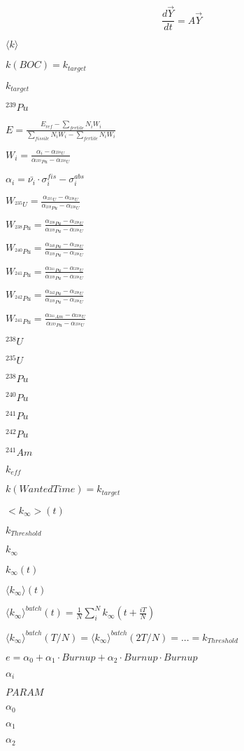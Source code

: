 \documentclass{article}
\begin{document}
\[ \frac{d\vec{Y}}{dt} = A\vec{Y}\]
\pagebreak

$\langle k \rangle$
\pagebreak

$ k(BOC) = k_{target}$
\pagebreak

$k_{target}$
\pagebreak

$^{239}Pu$
\pagebreak

$E = \frac{E_{ref} - \sum_{fertile}N_{i}W_{i} }{\sum_{fissile}N_{i}W_{i}-\sum_{fertile}N_{i}W_{i}}$
\pagebreak

$W_i = \frac{\alpha_{i} - \alpha_{^{238}U} }{\alpha_{^{239}Pu}-\alpha_{^{238}U}}$
\pagebreak

$\alpha_{i} = \bar{\nu_{i}}\cdot\sigma_{i}^{fis} - \sigma_{i}^{abs}$
\pagebreak

$W_{^{235}U} = \frac{\alpha_{{^{235}U}} - \alpha_{^{238}U} }{\alpha_{^{239}Pu}-\alpha_{^{238}U}}$
\pagebreak

$W_{^{238}Pu} = \frac{\alpha_{{^{238}Pu}} - \alpha_{^{238}U} }{\alpha_{^{239}Pu}-\alpha_{^{238}U}}$
\pagebreak

$W_{^{240}Pu} = \frac{\alpha_{{^{240}Pu}} - \alpha_{^{238}U} }{\alpha_{^{239}Pu}-\alpha_{^{238}U}}$
\pagebreak

$W_{^{241}Pu} = \frac{\alpha_{{^{241}Pu}} - \alpha_{^{238}U} }{\alpha_{^{239}Pu}-\alpha_{^{238}U}}$
\pagebreak

$W_{^{242}Pu} = \frac{\alpha_{{^{242}Pu}} - \alpha_{^{238}U} }{\alpha_{^{239}Pu}-\alpha_{^{238}U}}$
\pagebreak

$W_{^{241}Pu} = \frac{\alpha_{{^{241}Am}} - \alpha_{^{238}U} }{\alpha_{^{239}Pu}-\alpha_{^{238}U}}$
\pagebreak

$^{238}U$
\pagebreak

$^{235}U$
\pagebreak

$^{238}Pu$
\pagebreak

$^{240}Pu$
\pagebreak

$^{241}Pu$
\pagebreak

$^{242}Pu$
\pagebreak

$^{241}Am$
\pagebreak

$k_{eff}$
\pagebreak

$ k(WantedTime) = k_{target}$
\pagebreak

$<k_{\infty}>(t)$
\pagebreak

$k_{Threshold}$
\pagebreak

$k_{\infty}$
\pagebreak

$k_{\infty}(t)$
\pagebreak

$\langle k_{\infty}\rangle (t)$
\pagebreak

$\langle k_{\infty}\rangle ^{batch}(t) = \frac{1}{N}\sum_{i}^{N}k_{\infty}(t+\frac{iT}{N})$
\pagebreak

$\langle k_{\infty}\rangle ^{batch}(T/N) = \langle k_{\infty}\rangle ^{batch}(2T/N) = ... = k_{Threshold}$
\pagebreak

$e = \alpha_{0} + \alpha_{1}\cdot Burnup + \alpha_{2}\cdot Burnup \cdot Burnup $
\pagebreak

$\alpha_{i}$
\pagebreak

$PARAM$
\pagebreak

$\alpha_{0}$
\pagebreak

$\alpha_{1}$
\pagebreak

$\alpha_{2}$
\pagebreak
\end{document}
